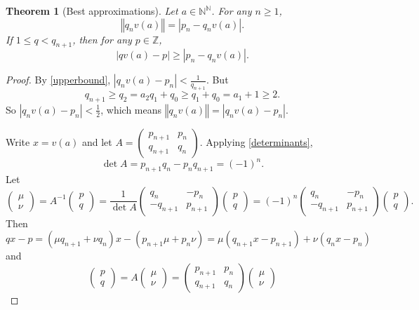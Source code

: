 \documentclass{amsart}
\newcommand{\norm}[1]{\left\Vert #1 \right\Vert}
\newtheorem{theorem}{Theorem}
\begin{document}
\begin{theorem}[Best approximations]
Let $a \in \mathbb{N}^{\mathbb{N}}$. For any $n \geq 1$,
\[
\norm{q_n v(a)} = |p_n-q_n v(a)|.
\]
If $1 \leq q < q_{n+1}$, then for any $p \in \mathbb{Z}$,
\[
|qv(a)-  p| \geq |p_n-q_n v(a)|.
\]
\label{bestapproximation}
\end{theorem}
\begin{proof}
By \eqref{upperbound}, $|q_n v(a) - p_n| < \frac{1}{q_{n+1}}$. 
But
\[
q_{n+1} \geq q_2 = a_2q_1+q_0 \geq q_1 + q_0 = a_1 + 1 \geq 2.
\]
So $|q_n v(a) - p_n| < \frac{1}{2}$, which means 
$\norm{q_n v(a)} = |q_n v(a) - p_n|$.  

Write $x=v(a)$ and
let $A = \begin{pmatrix} p_{n+1}&p_n\\ q_{n+1}&q_n \end{pmatrix}$. Applying
\eqref{determinants},
\[
\det A = p_{n+1}q_n - p_n q_{n+1} = (-1)^n. 
\] 
Let 
\[
\begin{pmatrix}\mu \\ \nu \end{pmatrix} = A^{-1} \begin{pmatrix} p\\ q \end{pmatrix}
=\frac{1}{\det A} \begin{pmatrix} q_n&-p_n\\ -q_{n+1}&p_{n+1} \end{pmatrix}  \begin{pmatrix} p\\ q \end{pmatrix}
=(-1)^n  \begin{pmatrix} q_n&-p_n\\ -q_{n+1}&p_{n+1} \end{pmatrix}  \begin{pmatrix} p\\ q \end{pmatrix}.
\]
Then
\[
q x - p = (\mu q_{n+1} + \nu q_n)x - (p_{n+1} \mu + p_n \nu)
=\mu (q_{n+1} x - p_{n+1}) + \nu(q_n x - p_n)
\]
and
\[
\begin{pmatrix}p\\ q\end{pmatrix}
=A \begin{pmatrix}\mu\\ \nu\end{pmatrix}
= \begin{pmatrix} p_{n+1}&p_n\\ q_{n+1}&q_n \end{pmatrix}\begin{pmatrix}\mu\\ \nu\end{pmatrix}
\]
\end{proof}
\end{document}

